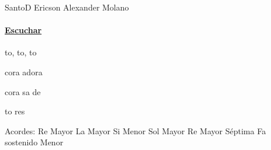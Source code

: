 \documentclass[12pt, spanish]{book}
\begin{document}
    \begin{song}{Santo}{D}
    {} %
    {Ericson Alexander Molano}
    {} %
    {} %
        \ifChordBk
        \paragraph{\mbox{}\hfill\protect\href{https://open.spotify.com/intl-es/track/7fb0juH8O7ABLeS6aXSrMJ}{Escuchar}\mbox{}\hfill}
        \fi

        \begin{SBOpGroup}
            to, to, to~

             cora  adora~

             cora sa de

            to res 
        \end{SBOpGroup}

        \ifChordBk
        \begin{SBOpGroup}
            Acordes:
            \upchord{\D}\qquad Re Mayor \hfill
            \upchord{\A}\qquad La Mayor \hfill\null\break
            \upchord{\Bm}\qquad Si Menor \hfill
            \upchord{\G}\qquad Sol Mayor \hfill\null\break
            \upchord{\Dseven}\qquad Re Mayor S\'eptima \hfill
            \upchord{\Fsm}\qquad Fa sostenido Menor \hfill\null\break
        \end{SBOpGroup}
        \fi
    \end{song}
\end{document}
